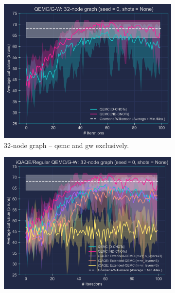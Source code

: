 \begin{figure}[hb!]
    \centering
    \begin{subfigure}[b]{0.495\textwidth}
        \centering
        \includegraphics[width=1\textwidth, height=0.812\textwidth]{Figures/Chapter_5/Large graphs/32-node_Graph(QEMC&G-W)_seed=0.png}
        \caption{$32$-node graph – \acrshort{qemc} and \acrshort{gw} exclusively.}
        \label{fig:32-node_Graph(QEMC&G-W)}
    \end{subfigure}
    \hfill
    \begin{subfigure}[b]{0.495\textwidth}
        \centering
        \includegraphics[width=1\textwidth, height=0.812\textwidth]{Figures/Chapter_5/Large graphs/32-node_Graph_seed=0.png}

\end{subfigure}
\end{figure}
